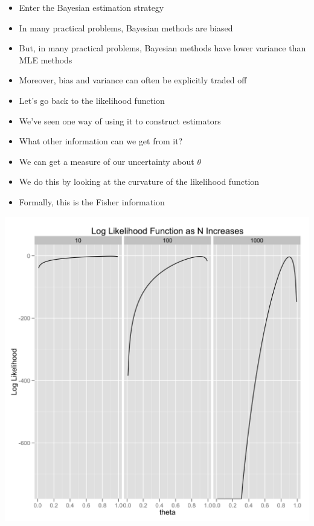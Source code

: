 \documentclass{beamer}
\begin{document}
\frame
{
  \begin{itemize}
    \item{Enter the Bayesian estimation strategy}
    \item{In many practical problems, Bayesian methods are biased}
    \item{But, in many practical problems, Bayesian methods have lower variance than MLE methods}
    \item{Moreover, bias and variance can often be explicitly traded off}
  \end{itemize}
}

\frame
{
  \begin{itemize}
    \item{Let's go back to the likelihood function}
    \item{We've seen one way of using it to construct estimators}
    \item{What other information can we get from it?}
  \end{itemize}
}

\frame
{
  \begin{itemize}
    \item{We can get a measure of our uncertainty about $\theta$}
    \item{We do this by looking at the curvature of the likelihood function}
    \item{Formally, this is the Fisher information}
  \end{itemize}
}

\frame
{
  \begin{center}
    \includegraphics[scale = 0.1]{fisher_information.png}
  \end{center}
}
\end{document}
